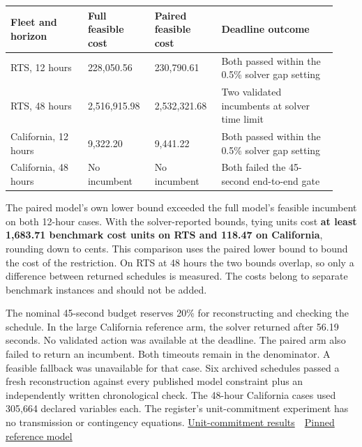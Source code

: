 \documentclass[11pt,letterpaper]{article}
\begin{document}
\begingroup\small\setlength{\tabcolsep}{4pt}\renewcommand{\arraystretch}{1.22}\begin{tabular}{@{}P{0.22\linewidth}P{0.19\linewidth}P{0.19\linewidth}P{0.33\linewidth}@{}}\toprule
\textbf{Fleet and horizon} & \textbf{Full feasible cost} & \textbf{Paired feasible cost} & \textbf{Deadline outcome}\\
\midrule
RTS, 12 hours & 228,050.56 & 230,790.61 & Both passed within the 0.5\% solver gap setting\\
RTS, 48 hours & 2,516,915.98 & 2,532,321.68 & Two validated incumbents at solver time limit\\
California, 12 hours & 9,322.20 & 9,441.22 & Both passed within the 0.5\% solver gap setting\\
California, 48 hours & No incumbent & No incumbent & Both failed the 45-second end-to-end gate\\
\bottomrule\end{tabular}\endgroup\par
The paired model's own lower bound exceeded the full model's feasible incumbent on both 12-hour cases. With the solver-reported bounds, tying units cost \textbf{at least 1,683.71 benchmark cost units on RTS and 118.47 on California}, rounding down to cents. This comparison uses the paired lower bound to bound the cost of the restriction. On RTS at 48 hours the two bounds overlap, so only a difference between returned schedules is measured. The costs belong to separate benchmark instances and should not be added.\par
The nominal 45-second budget reserves 20\% for reconstructing and checking the schedule. In the large California reference arm, the solver returned after 56.19 seconds. No validated action was available at the deadline. The paired arm also failed to return an incumbent. Both timeouts remain in the denominator. A feasible fallback was unavailable for that case. Six archived schedules passed a fresh reconstruction against every published model constraint plus an independently written chronological check. The 48-hour California cases used 305,664 declared variables each. The register's unit-commitment experiment has no transmission or contingency equations. \href{https://github.com/nousentllc/VP-VNP-Review/blob/energy-explorations/energy/W03/results/D/comparison.csv}{Unit-commitment results} \,\textperiodcentered\, \href{https://github.com/power-grid-lib/pglib-uc/blob/39a7f38cf4703de92f0291f0c873c2e98c789301/uc_model.py}{Pinned reference model}\par
\end{document}

